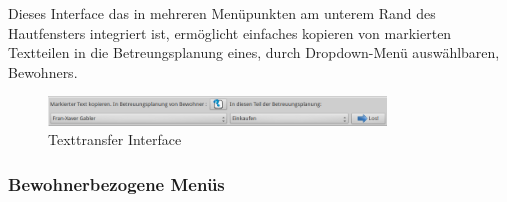 \begin{itemize}
	\noindent
	Dieses Interface das in mehreren Menüpunkten am unterem Rand des Hautfensters integriert ist, ermöglicht einfaches kopieren von markierten Textteilen in die Betreungsplanung eines, durch Dropdown-Menü auswählbaren, Bewohners.
	\begin{figure}[h]
		\begin{center}
			\includegraphics[keepaspectratio=true, width=0.8\textwidth]{pics/client_texttransfer.png}
			\caption{Texttransfer Interface}
		\end{center}
	\end{figure}
	\FloatBarrier
\end{itemize}
\newpage
\subsubsection{Bewohnerbezogene Menüs}

